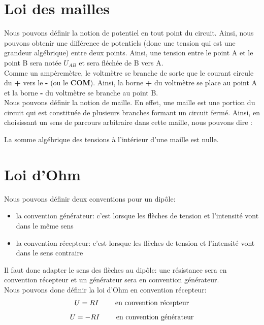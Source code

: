 \documentclass[12pt,a4paper,openany]{book}
\begin{document}
\section{Loi des mailles}

Nous pouvons définir la notion de potentiel en tout point du circuit. Ainsi, nous pouvons obtenir une différence de potentiels (donc une tension qui est une grandeur algébrique) entre deux points. Ainsi, une tension entre le point A et le point B sera notée $ U_{AB} $ et sera fléchée de B vers A.\\
Comme un ampèremètre, le voltmètre se branche de sorte que le courant circule du \textbf{+} vers le \textbf{-} (ou le \textbf{COM}). Ainsi, la borne \textbf{+} du voltmètre se place au point A et la borne \textbf{-} du voltmètre se branche au point B.\\
Nous pouvons définir la notion de maille. En effet, une maille est une portion du circuit qui est constituée de plusieurs branches formant un circuit fermé. Ainsi, en choisissant un sens de parcours arbitraire dans cette maille, nous pouvons dire :
\begin{Definition}
La somme algébrique des tensions à l'intérieur d'une maille est nulle.
\end{Definition} 

\newpage

\section{Loi d'Ohm}

Nous pouvons définir deux conventions pour un dipôle:
\begin{itemize}
\item la convention générateur: c'est lorsque les flèches de tension et l'intensité vont dans le même sens
\item la convention récepteur: c'est lorsque les flèches de tension et l'intensité vont dans le sens contraire
\end{itemize}

Il faut donc adapter le sens des flèches au dipôle: une résistance sera en convention récepteur et un générateur sera en convention générateur.\\
Nous pouvons donc définir la loi d'Ohm en convention récepteur:
\begin{equation}
U = RI \text{\hspace{20px} en convention récepteur}
\end{equation}
\begin{equation}
U = -RI \text{\hspace{20px} en convention générateur}
\end{equation}
\end{document}
